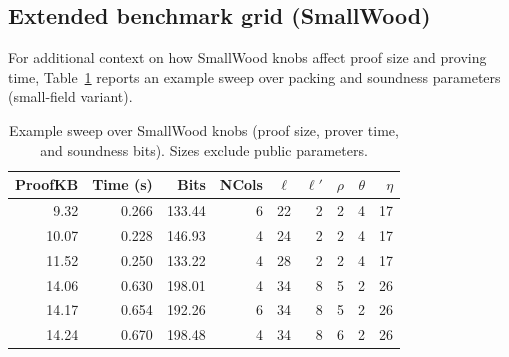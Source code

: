 \subsection{Extended benchmark grid (SmallWood)}
For additional context on how SmallWood knobs affect proof size and proving time, Table~\ref{tab:results-grid} reports
an example sweep over packing and soundness parameters (small-field variant).

\begin{table}[H]
\centering
\footnotesize
\setlength{\tabcolsep}{4pt}
\begin{tabular}{r r r r r r r r r}
\toprule
\textbf{ProofKB} & \textbf{Time (s)} & \textbf{Bits} & \textbf{NCols} & \(\ell\) & \(\ell'\) & \(\rho\) & \(\theta\) & \(\eta\)\\
\midrule
\ \ 9.32 & 0.266 & 133.44 & 6 & 22 & 2 & 2 & 4 & 17 \\
10.07 & 0.228 & 146.93 & 4 & 24 & 2 & 2 & 4 & 17 \\
11.52 & 0.250 & 133.22 & 4 & 28 & 2 & 2 & 4 & 17 \\
\midrule[1.2pt]
14.06 & 0.630 & 198.01 & 4 & 34 & 8 & 5 & 2 & 26 \\
14.17 & 0.654 & 192.26 & 6 & 34 & 8 & 5 & 2 & 26 \\
14.24 & 0.670 & 198.48 & 4 & 34 & 8 & 6 & 2 & 26 \\
\bottomrule
\end{tabular}
\caption{Example sweep over SmallWood knobs (proof size, prover time, and soundness bits). Sizes exclude public
parameters.}
\label{tab:results-grid}
\end{table}
